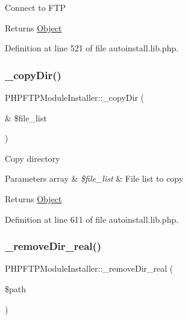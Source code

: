 Connect to F\+TP

\begin{DoxyReturn}{Returns}
\hyperlink{classObject}{Object} 
\end{DoxyReturn}


Definition at line 521 of file autoinstall.\+lib.\+php.

\hypertarget{classPHPFTPModuleInstaller_ae9c696b9a99eea744500a23c2f30c81a}{}\label{classPHPFTPModuleInstaller_ae9c696b9a99eea744500a23c2f30c81a} 
\subsubsection{\texorpdfstring{\+\_\+copy\+Dir()}{\_copyDir()}}
{\footnotesize\ttfamily P\+H\+P\+F\+T\+P\+Module\+Installer\+::\+\_\+copy\+Dir (\begin{DoxyParamCaption}\item[{\&}]{\$file\+\_\+list }\end{DoxyParamCaption})}

Copy directory


\begin{DoxyParams}[1]{Parameters}
array & {\em \$file\+\_\+list} & File list to copy \\
\hline
\end{DoxyParams}
\begin{DoxyReturn}{Returns}
\hyperlink{classObject}{Object} 
\end{DoxyReturn}


Definition at line 611 of file autoinstall.\+lib.\+php.

\hypertarget{classPHPFTPModuleInstaller_abc79bfe0eea3d10f91672313cf8763c0}{}\label{classPHPFTPModuleInstaller_abc79bfe0eea3d10f91672313cf8763c0} 
\subsubsection{\texorpdfstring{\+\_\+remove\+Dir\+\_\+real()}{\_removeDir\_real()}}
{\footnotesize\ttfamily P\+H\+P\+F\+T\+P\+Module\+Installer\+::\+\_\+remove\+Dir\+\_\+real (\begin{DoxyParamCaption}\item[{}]{\$path }\end{DoxyParamCaption})}


